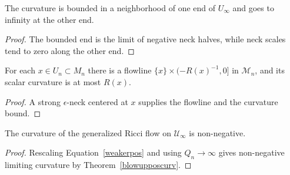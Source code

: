 \begin{claim}
\label{claim:curvature-bounded-one-end-infinite-other}
The curvature is bounded in a neighborhood of one end of $U_\infty$
and goes to infinity at the other end.
\end{claim}
\begin{proof}
\sketch The bounded end is the limit of negative neck halves, while
neck scales tend to zero along the other end.
\end{proof}

\begin{claim}
\label{claim:flowline-exists-for-x}
For each $x\in U_n\subset M_n$ there is a flowline $\{x\}\times
(-R(x)^{-1},0]$ in ${\mathcal M}_n$, and its scalar curvature is at
most $R(x)$.
\end{claim}
\begin{proof}
\sketch A strong $\epsilon$-neck centered at $x$ supplies the flowline
and the curvature bound.
\end{proof}

\begin{claim}
\label{claim:limiting-flow-nonnegative-curvature}
The curvature of the generalized Ricci flow on ${\mathcal
U}_\infty$ is non-negative.
\end{claim}
\begin{proof}
\sketch Rescaling Equation~\ref{weakerpos} and using $Q_n\to\infty$
gives non-negative limiting curvature by Theorem~\ref{blowupposcurv}.
\end{proof}


